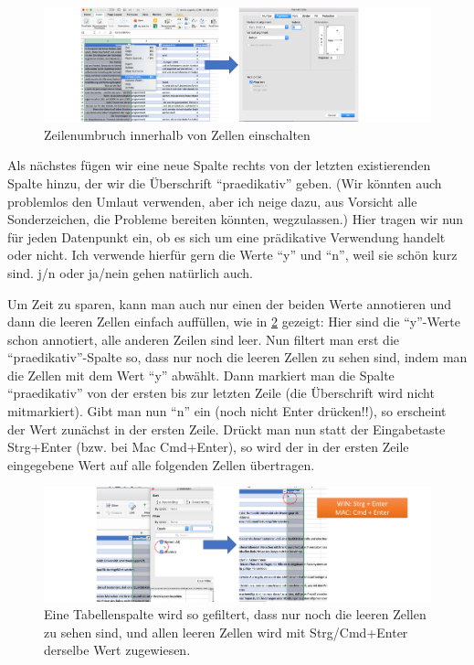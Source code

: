 \documentclass[]{article}
\begin{document}
\begin{figure}
\includegraphics[width=6.66in]{fig/excellinewrap} \caption{Zeilenumbruch innerhalb von Zellen einschalten}\label{fig:excelwrap}
\end{figure}

Als nächstes fügen wir eine neue Spalte rechts von der letzten
existierenden Spalte hinzu, der wir die Überschrift ``praedikativ''
geben. (Wir könnten auch problemlos den Umlaut verwenden, aber ich neige
dazu, aus Vorsicht alle Sonderzeichen, die Probleme bereiten könnten,
wegzulassen.) Hier tragen wir nun für jeden Datenpunkt ein, ob es sich
um eine prädikative Verwendung handelt oder nicht. Ich verwende hierfür
gern die Werte ``y'' und ``n'', weil sie schön kurz sind. j/n oder
ja/nein gehen natürlich auch.

Um Zeit zu sparen, kann man auch nur einen der beiden Werte annotieren
und dann die leeren Zellen einfach auffüllen, wie in
\ref{fig:excelbulkchange} gezeigt: Hier sind die ``y''-Werte schon
annotiert, alle anderen Zeilen sind leer. Nun filtert man erst die
``praedikativ''-Spalte so, dass nur noch die leeren Zellen zu sehen
sind, indem man die Zellen mit dem Wert ``y'' abwählt. Dann markiert man
die Spalte ``praedikativ'' von der ersten bis zur letzten Zeile (die
Überschrift wird nicht mitmarkiert). Gibt man nun ``n'' ein (noch nicht
Enter drücken!!), so erscheint der Wert zunächst in der ersten Zeile.
Drückt man nun statt der Eingabetaste Strg+Enter (bzw. bei Mac
Cmd+Enter), so wird der in der ersten Zeile eingegebene Wert auf alle
folgenden Zellen übertragen.

\begin{figure}
\includegraphics[width=6.66in]{fig/excel_bulk_change} \caption{Eine Tabellenspalte wird so gefiltert, dass nur noch die leeren Zellen zu sehen sind, und allen leeren Zellen wird mit Strg/Cmd+Enter derselbe Wert zugewiesen.}\label{fig:excelbulkchange}
\end{figure}
\end{document}

